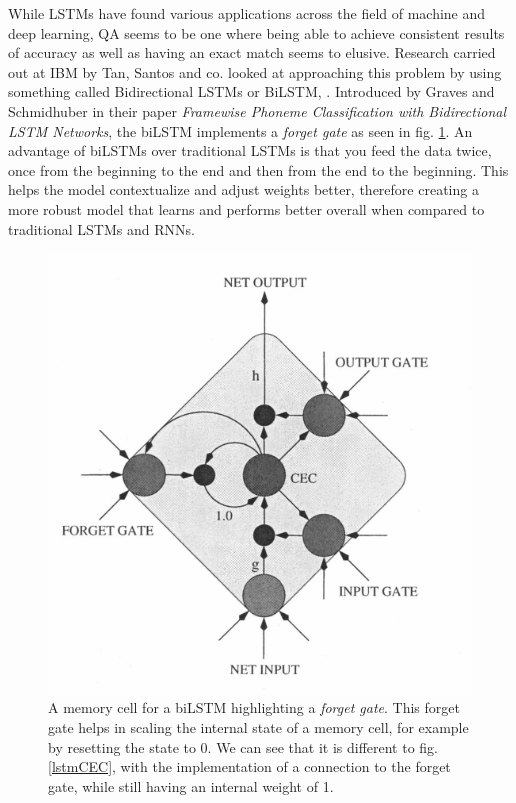 \documentclass[12pt]{report}
\begin{document}
            While LSTMs have found various applications across the field of machine and deep learning, QA seems to be one where being able to achieve consistent results of accuracy as well as having an exact match seems to elusive.
            Research carried out at IBM by Tan, Santos and co. looked at approaching this problem by using something called Bidirectional LSTMs or BiLSTM, \citep{lstmBiLSTM}. Introduced by Graves and Schmidhuber in their paper \textit{Framewise Phoneme Classification with Bidirectional LSTM Networks}, the biLSTM implements a \textit{forget gate} as seen in fig. \ref{lstmBilstm}. An advantage of biLSTMs over traditional LSTMs is that you feed the data twice, once from the beginning to the end and then from the end to the beginning. This helps the model contextualize and adjust weights better, therefore creating a more robust model that learns and performs better overall when compared to traditional LSTMs and RNNs.
             \begin{figure}[!h]
	           \centering
               \includegraphics[scale=0.35]{../images/lstm-biLstm.png}
      		   \caption{A memory cell for a biLSTM highlighting a \textit{forget gate}. This forget gate helps in scaling the internal state of a memory cell, for example by resetting the state to 0. We can see that it is different to fig. \ref{lstmCEC}, with the implementation of a connection to the forget gate, while still having an internal weight of 1. \citep{lstmBiLSTM}}\label{lstmBilstm}
            \end{figure}
\end{document}

